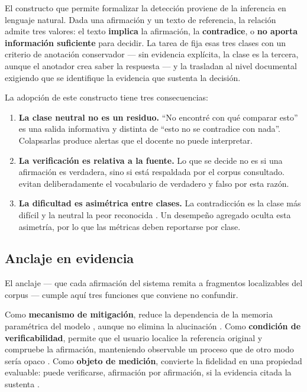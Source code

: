 El constructo que permite formalizar la detección proviene de la inferencia en
lenguaje natural. Dada una afirmación y un texto de referencia, la relación admite
tres valores: el texto \textbf{implica} la afirmación, la \textbf{contradice}, o
\textbf{no aporta información suficiente} para decidir. La tarea de
\textcite{thorne2018fever} fija esas tres clases con un criterio de anotación
conservador --- sin evidencia explícita, la clase es la tercera, aunque el anotador
crea saber la respuesta --- y \textcite{koreeda2021contractnli} la trasladan al nivel
documental exigiendo que se identifique la evidencia que sustenta la decisión.

La adopción de este constructo tiene tres consecuencias:

\begin{enumerate}
  \item \textbf{La clase neutral no es un residuo.} \enquote{No encontré con qué
        comparar esto} es una salida informativa y distinta de \enquote{esto no se
        contradice con nada}. Colapsarlas produce alertas que el docente no puede
        interpretar.
  \item \textbf{La verificación es relativa a la fuente.} Lo que se decide no es si
        una afirmación es verdadera, sino si está respaldada por el corpus
        consultado. \textcite{thorne2018fever} evitan deliberadamente el vocabulario
        de verdadero y falso por esta razón.
  \item \textbf{La dificultad es asimétrica entre clases.} La contradicción es la
        clase más difícil \parencite{koreeda2021contractnli} y la neutral la peor
        reconocida \parencite{gubelmann2024capturing}. Un desempeño agregado oculta
        esta asimetría, por lo que las métricas deben reportarse por clase.
\end{enumerate}

\subsection{Anclaje en evidencia}
\label{sec:teo-evidencia}

El anclaje --- que cada afirmación del sistema remita a fragmentos localizables del
corpus --- cumple aquí tres funciones que conviene no confundir.

Como \textbf{mecanismo de mitigación}, reduce la dependencia de la memoria
paramétrica del modelo \parencite{lewis2020retrieval}, aunque no elimina la
alucinación \parencite{huang2025survey}. Como \textbf{condición de verificabilidad},
permite que el usuario localice la referencia original y compruebe la afirmación,
manteniendo observable un proceso que de otro modo sería opaco
\parencite[p.~14]{gao2024retrieval}. Como \textbf{objeto de medición}, convierte la
fidelidad en una propiedad evaluable: puede verificarse, afirmación por afirmación,
si la evidencia citada la sustenta \parencite{min2023factscore,es2024ragas}.

